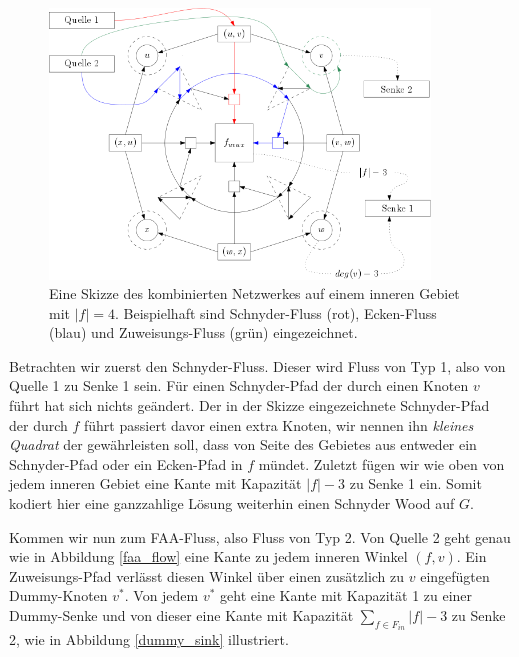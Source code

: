 \begin{figure}[h]
	\centering
  	\includegraphics[width=0.9\textwidth]{combined_face_sketch.png}
  	\caption{Eine Skizze des kombinierten Netzwerkes auf einem inneren Gebiet mit $|f| = 4$. Beispielhaft sind Schnyder-Fluss (rot), Ecken-Fluss (blau) und Zuweisungs-Fluss (grün) eingezeichnet. }
	\label{combined_face_sketch}
\end{figure}

Betrachten wir zuerst den Schnyder-Fluss. Dieser wird Fluss von Typ 1, also von Quelle 1 zu Senke 1 sein. Für einen Schnyder-Pfad der durch einen Knoten $v$ führt hat sich nichts geändert. Der in der Skizze eingezeichnete Schnyder-Pfad der durch $f$ führt passiert davor einen extra Knoten, wir nennen ihn \textit{kleines Quadrat} der gewährleisten soll, dass von Seite des Gebietes aus entweder ein Schnyder-Pfad oder ein Ecken-Pfad in $f$ mündet. Zuletzt fügen wir wie oben von jedem inneren Gebiet eine Kante mit Kapazität $|f|-3$ zu Senke 1 ein. Somit kodiert hier eine ganzzahlige Lösung weiterhin einen Schnyder Wood auf $G$.\

Kommen wir nun zum FAA-Fluss, also Fluss von Typ 2. Von Quelle 2 geht genau wie in Abbildung \ref{faa_flow} eine Kante zu jedem inneren Winkel $(f,v)$. Ein Zuweisungs-Pfad verlässt diesen Winkel über einen zusätzlich zu $v$ eingefügten Dummy-Knoten $v^*$. Von jedem $v^*$ geht eine Kante mit Kapazität 1 zu einer Dummy-Senke und von dieser eine Kante mit Kapazität $\sum_{f \in F_{in}} |f|-3$ zu Senke 2, wie in Abbildung \ref{dummy_sink} illustriert.

